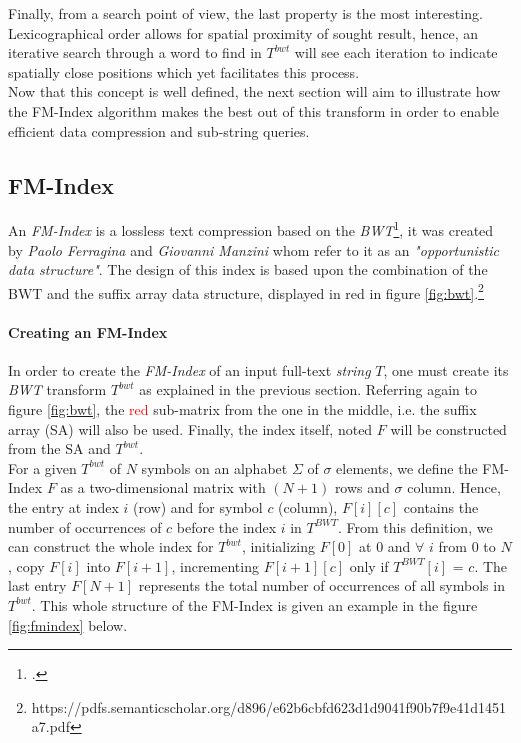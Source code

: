 Finally, from a search point of view, the last property is the most interesting. Lexicographical order allows for spatial proximity of sought result, hence, an iterative search through a word to find in $T^{bwt}$ will see each iteration to indicate spatially close positions which yet facilitates this process.\\

Now that this concept is well defined, the next section will aim to illustrate how the FM-Index algorithm makes the best out of this transform in order to enable efficient data compression and sub-string queries.

\subsection{FM-Index}

An \textsl{FM-Index} is a lossless text compression based on the \textsl{BWT}\footcite{FM_INDEX}, it was created by \textsl{Paolo Ferragina} and \textsl{Giovanni Manzini} whom refer to it as an \textit{"opportunistic data structure"}. The design of this index is based upon the combination of the BWT and the suffix array data structure, displayed in red in figure \ref{fig:bwt}.\footnote{https://pdfs.semanticscholar.org/d896/e62b6cbfd623d1d9041f90b7f9e41d1451a7.pdf}

\paragraph{Creating an FM-Index}

In order to create the \textsl{FM-Index} of an input full-text \textit{string} $T$, one must create its \textsl{BWT} transform $T^{bwt}$ as explained in the previous section. Referring again to figure \ref{fig:bwt}, the \textcolor{red}{red} sub-matrix from the one in the middle, i.e. the suffix array (SA) will also be used. Finally, the index itself, noted $F$ will be constructed from the SA and $T^{bwt}$. \\

For a given $T^{bwt}$ of $N$ symbols on an alphabet $\Sigma$ of $\sigma$ elements, we define the FM-Index $F$ as a two-dimensional matrix with $(N + 1)$ rows and $\sigma$ column. Hence, the entry at index $i$ (row) and for symbol $c$ (column), $F[i][c]$ contains the number of occurrences of $c$ before the index $i$ in $T^{BWT}$. From this definition, we can construct the whole index for $T^{bwt}$, initializing $F[0]$ at $0$ and $\forall$ $i$ from $0$ to $N$, copy $F[i]$ into $F[i+1]$, incrementing $F[i+1][c]$ only if $T^{BWT}[i]$ = $c$. The last entry $F[N + 1]$ represents the total number of occurrences of all symbols in $T^{bwt}$. This whole structure of the FM-Index is given an example in the figure \ref{fig:fmindex} below. \\

